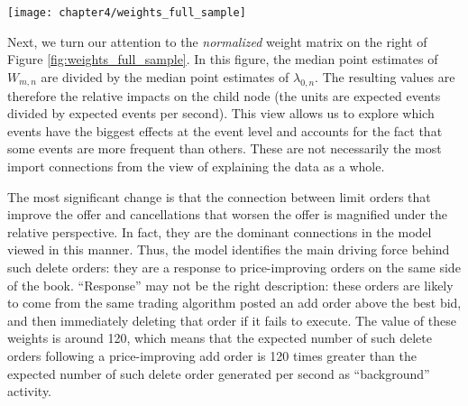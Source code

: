 		\begin{sidewaysfigure}[p]
			\small
			\linespread{1}
			\centering
			\texttt{[image: chapter4/weights\_full\_sample]}
			\captionsetup{skip=-20pt, position=below, font=footnotesize, justification=justified, width=\linewidth}
			\caption[Median of event connection point estimates: full sample]{Median of event connection point estimates: full sample. The figure shows the median connection strength between event types across the full sample of stocks. Larger values indicate stronger connections, which are expected to generate a greater number of child events. (Left) The median of connection weight estimates using the raw weight matrix estimates. This figure identifies the most important connections in an absolute sense. (Right) The median connection weight matrix after normalizing parent-child weights by the estimated background rate of child events. This figure identifies the most important connections in a relative sense.}
			\label{fig:weights_full_sample}
		\end{sidewaysfigure}

		Next, we turn our attention to the \textit{normalized} weight matrix on the right of Figure \ref{fig:weights_full_sample}. In this figure, the median point estimates of $W_{m,n}$ are divided by the median point estimates of $\lambda_{0,n}$. The resulting values are therefore the relative impacts on the child node (the units are expected events divided by expected events per second). This view allows us to explore which events have the biggest effects at the event level and accounts for the fact that some events are more frequent than others. These are not necessarily the most import connections from the view of explaining the data as a whole.

		The most significant change is that the connection between limit orders that improve the offer and cancellations that worsen the offer is magnified under the relative perspective. In fact, they are the dominant connections in the model viewed in this manner. Thus, the model identifies the main driving force behind such delete orders: they are a response to price-improving orders on the same side of the book. “Response” may not be the right description: these orders are likely to come from the same trading algorithm posted an add order above the best bid, and then immediately deleting that order if it fails to execute. The value of these weights is around 120, which means that the expected number of such delete orders following a price-improving add order is 120 times greater than the expected number of such delete order generated per second as “background” activity.

